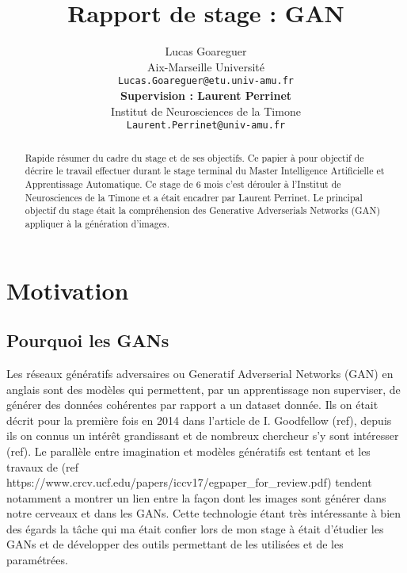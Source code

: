 \documentclass[11pt,francais]{article}
\title{Rapport de stage : GAN}
\author{Lucas Goareguer \\
  Aix-Marseille Université \\
  {\small \texttt{Lucas.Goareguer@etu.univ-amu.fr}   } \\\And
   {\bf Supervision : Laurent Perrinet} \\
  Institut de Neurosciences de la Timone \\
  {\small \tt Laurent.Perrinet@univ-amu.fr} \\}
\date{}
\begin{document}
\maketitle
\begin{abstract}
Rapide résumer du cadre du stage et de ses objectifs.
Ce papier à pour objectif de décrire le travail effectuer durant le stage terminal du Master Intelligence Artificielle et Apprentissage Automatique.
Ce stage de 6 mois c'est dérouler à l'Institut de Neurosciences de la Timone et a était encadrer par Laurent Perrinet.
Le principal objectif du stage était la compréhension des Generative Adverserials Networks (GAN) appliquer à la génération d'images.
\end{abstract}


\section{Motivation}

\subsection{Pourquoi les GANs}
Les réseaux génératifs adversaires ou Generatif Adverserial Networks (GAN) en anglais sont des modèles qui permettent, par un apprentissage non superviser, de générer des données cohérentes par rapport a un dataset donnée. Ils on était décrit pour la première fois en 2014 dans l'article de I. Goodfellow (ref), depuis ils on connus un intérêt grandissant et de nombreux chercheur s'y sont intéresser (ref). 
Le parallèle entre imagination et modèles génératifs est tentant et les travaux de (ref https://www.crcv.ucf.edu/papers/iccv17/egpaper_for_review.pdf) tendent notamment a montrer un lien entre la façon dont les images sont générer dans notre cerveaux et dans les GANs. 
Cette technologie étant très intéressante à bien des égards la tâche qui ma était confier lors de mon stage à était d'étudier les GANs et de développer des outils permettant de les utilisées et de les paramétrées. 
\end{document}
